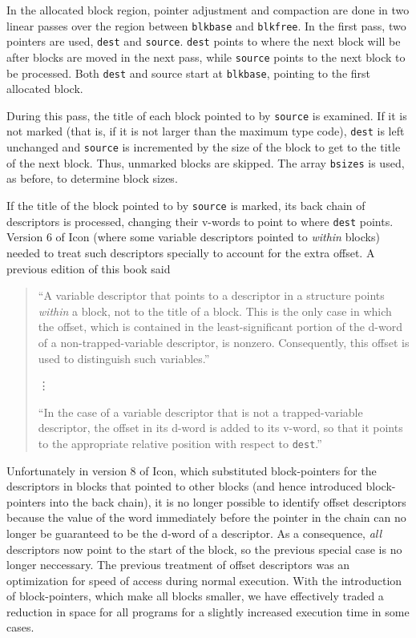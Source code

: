 In the allocated block region, pointer adjustment and compaction are
done in two linear passes over the region between \texttt{blkbase} and
\texttt{blkfree}. In the first pass, two pointers are used,
\texttt{dest} and \texttt{source}.  \texttt{dest} points to where the
next block will be after blocks are moved in the next pass, while
\texttt{source} points to the next block to be processed. Both
\texttt{dest} and source start at \texttt{blkbase}, pointing to the
first allocated block.

During this pass, the title of each block pointed to by
\texttt{source} is examined. If it is not marked (that is, if it is
not larger than the maximum type code), \texttt{dest} is left
unchanged and \texttt{source} is incremented by the size of the block
to get to the title of the next block. Thus, unmarked blocks are
skipped. The array \texttt{bsizes} is used, as before, to determine
block sizes.

If the title of the block pointed to by \texttt{source} is marked, its
back chain of descriptors is processed, changing their v-words to
point to where \texttt{dest} points. 
Version 6 of Icon (where some variable descriptors pointed to {\em
  within} blocks) needed to treat such descriptors specially to
account for the extra offset. A previous edition of this book said
\begin{quote}
``A variable descriptor that points to a descriptor in a structure
points \textit{within} a block, not to the title of a block. This is
the only case in which the offset, which is contained in the
least-significant portion of the d-word of a non-trapped-variable
descriptor, is nonzero. Consequently, this offset is used to
distinguish such variables.''

\hspace*{2.5in} \vdots

``In the case of a variable descriptor that is not a trapped-variable
descriptor, the offset in its d-word is added to its v-word, so that
it points to the appropriate relative position with respect to
\texttt{dest}.''
\end{quote}
Unfortunately in version 8 of Icon, which substituted block-pointers
for the descriptors in blocks that pointed to other blocks (and hence
introduced block-pointers into the back chain), it is no longer
possible to identify offset descriptors because the value of the word
immediately before the pointer in the chain can no longer be
guaranteed to be the d-word of a descriptor. As a consequence, {\em
  all} descriptors now point to the start of the block, so the
previous special case is no longer neccessary. The previous treatment
of offset descriptors was an optimization for speed of access during
normal execution. With the introduction of block-pointers, which make
all blocks smaller, we have effectively traded a reduction in space
for all programs for a slightly increased execution time in some
cases.

